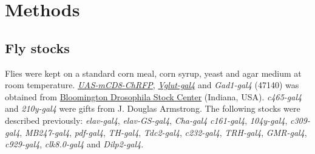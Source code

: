 \section*{Methods}

\subsection*{Fly stocks}

Flies were kept on a standard corn meal, corn syrup, yeast and agar medium at room temperature.
\href{http://flystocks.bio.indiana.edu/Reports/27392.html}{\emph{UAS-mCD8-ChRFP}}, \href{http://flystocks.bio.indiana.edu/Reports/26160.html}{\emph{Vglut-gal4}} and \emph{Gad1-gal4} (47140) was obtained from \href{http://flystocks.bio.indiana.edu}{Bloomington Drosophila Stock Center} (Indiana, USA).
\emph{c465-gal4} and \emph{210y-gal4} were gifts from J. Douglas Armstrong\cite{Young:2010jq}.
The following stocks were described previously: \emph{elav-gal4}\cite{Lin:1994vn}, \emph{elav-GS-gal4}\cite{Osterwalder_2001}, \emph{Cha-gal4}\cite{Kitamoto:2001ue} \emph{c161-gal4}\cite{renn:1999aa}, \emph{104y-gal4}\cite{sakai:2006aa}, \emph{c309-gal4}\cite{connolly:1996aa}, \emph{MB247-gal4}\cite{zars:2000aa}, \emph{pdf-gal4}\cite{renn:1999ab}, \emph{TH-gal4}\cite{friggi-grelin:2003aa}, \emph{Tdc2-gal4}\cite{alekseyenko:2010aa}, \emph{c232-gal4}\cite{renn:1999aa}, \emph{TRH-gal4}\cite{alekseyenko:2010aa}, \emph{GMR-gal4}\cite{freeman:1996aa}, \emph{c929-gal4}\cite{taghert:2001aa}, \emph{clk8.0-gal4}\cite{glossop:2003aa} and \emph{Dilp2-gal4}\cite{Rulifson:2002cg}. 
  
  
  
  
  
  
  
  
  